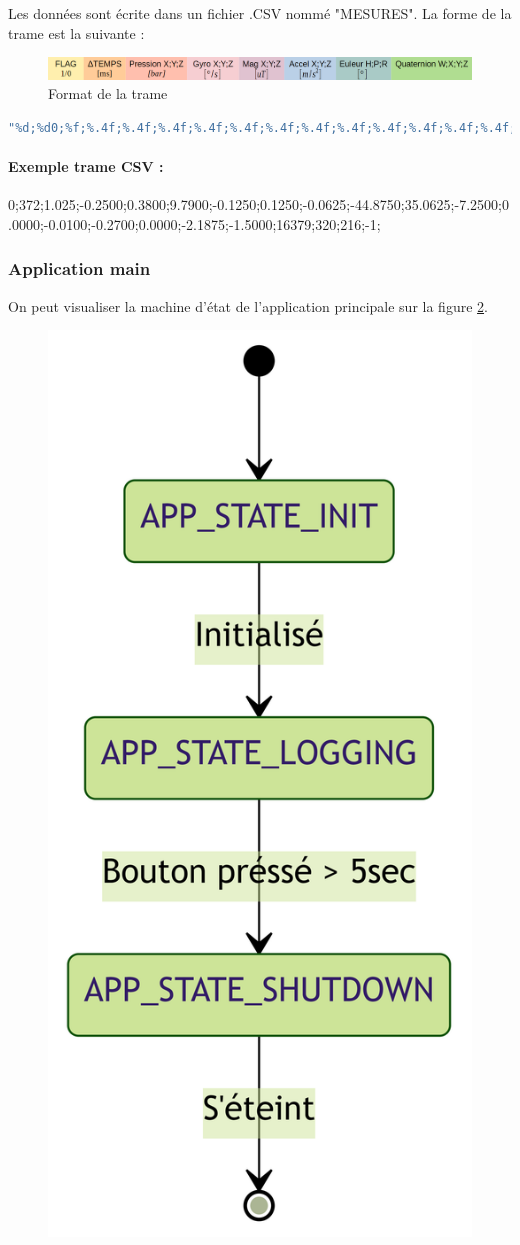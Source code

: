 {	Les données sont écrite dans un fichier .CSV nommé "MESURES". La forme de la trame est la suivante :
	
	\begin{figure}[h]
		\centering
		\includegraphics[width=1.1\textwidth]{Figures/Dev-SOFT/Trame}
		\caption{Format de la trame}
		\label{fig:trame}
	\end{figure}

	\begin{lstlisting}[frame=single, language=C, caption={Ecriture du buffer}, captionpos=b, breaklines=true]
"%d;%d0;%f;%.4f;%.4f;%.4f;%.4f;%.4f;%.4f;%.4f;%.4f;%.4f;%.4f;%.4f;%.4f;%.4f;%.4f;%.4f;%d;%d;%d;%d;"
	\end{lstlisting}
	
	\paragraph{Exemple trame CSV :} 
	0;372;1.025;-0.2500;0.3800;9.7900;-0.1250;0.1250;-0.0625;-44.8750;35.0625;-7.2500;0.0000;-0.0100;-0.2700;0.0000;-2.1875;-1.5000;16379;320;216;-1;

	
	\subsubsection{Application main}
	On peut visualiser la machine d'état de l'application principale sur la figure \ref{fig:stateapp}.
	\begin{figure}[h]
		\centering
		\includegraphics[width=0.28\linewidth]{Figures/Dev-SOFT/StateApp}
		\caption{}
		\label{fig:stateapp}
	\end{figure}

}
